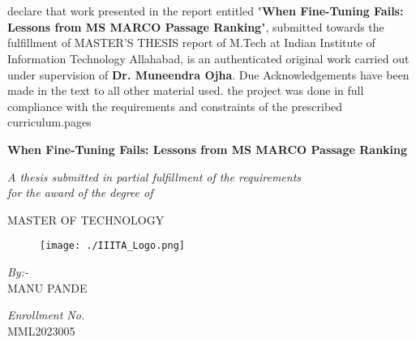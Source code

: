 \begin{spacing}{2.0}
\begin{flushright}
    \begin{minipage}{0.5\textwidth}
        \flushright \vspace{60 pt}
        \underline{\hspace{6cm}} \\
         \\[80pt]declare that work presented in the report entitled "\textbf{When Fine-Tuning Fails: Lessons from MS MARCO Passage Ranking}", submitted towards the fulfillment of MASTER'S THESIS report of M.Tech at Indian Institute of Information Technology Allahabad, is an authenticated original work carried out under supervision of \textbf{Dr. Muneendra Ojha}. Due Acknowledgements have been made in the text to all other material used. the project was done in full compliance with the requirements and constraints of the prescribed curriculum.pages

\pagestyle{plain} %

\begin{titlepage}
\begin{center}
\begin{spacing}{1.2}

{\huge \bfseries When Fine-Tuning Fails: Lessons from MS MARCO Passage Ranking\par}  %

\vspace {5mm}
\textit{A thesis submitted in partial fulfillment of the requirements\\for the award of the degree of} 

\vspace{7mm}
\textsc{\huge MASTER OF TECHNOLOGY}

\vspace {3mm}
\begin{figure}[htp]
    \centering
    \texttt{[image: ./IIITA\_Logo.png]}
\end{figure}
\begin{minipage}[t]{0.5\textwidth}
    \begin{flushleft} \large
        \textit{By:-} \\%
            \textsc{MANU PANDE} %
    \end{flushleft}
\end{minipage}
\begin{minipage}[t]{0.45\textwidth}
    \begin{flushright} \large
        \textit{Enrollment No.} \\
            \textsc{MML2023005} %
    \end{flushright}
\end{minipage}\\[1cm]


\end{spacing}
\end{center}
\end{titlepage}
\end{minipage}
\end{flushright}
\end{spacing}
